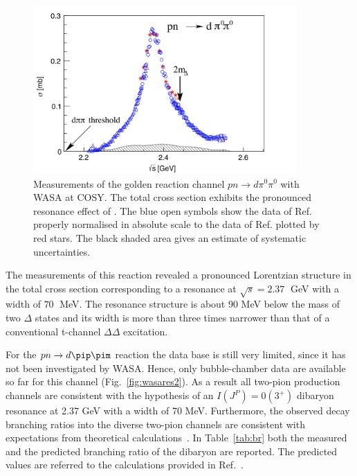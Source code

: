 \begin{figure} [htb]
    \centering
    \includegraphics[width=0.9\textwidth]{gfx/wasares1}
	\caption{Measurements of the golden reaction channel $pn \rightarrow d \pi^{0} \pi^{0}$ with WASA at COSY. The total cross section exhibits the pronounced resonance effect of \dst. The blue open symbols show the data of Ref.\cite{wasa1} properly normalised in absolute scale to the data of Ref.\cite{wasa2} plotted by red stars. The black shaded area gives an estimate of systematic uncertainties.}
	\label{fig:wasares1}
\end{figure}

The measurements of this reaction revealed a pronounced Lorentzian structure in the total cross section
corresponding to a resonance at $\sqrt{s} = 2.37\;$ GeV with a width of $70\;$ MeV. 
The resonance structure is about 90 MeV below the mass of two $\Delta$ states and its width is more 
than three times narrower than that of a conventional t-channel $\Delta\Delta$ excitation.

For the $pn \rightarrow d \pip \pim$ reaction the data base is still very limited, since it has not been
investigated by WASA. Hence, only bubble-chamber data are available so far for this channel 
(Fig.~\ref{fig:wasares2}).
As a result all two-pion production channels are consistent with the hypothesis of an $I(J^{P}) = 0(3^{+})$
dibaryon resonance at 2.37 GeV with a width of 70 MeV. 
Furthermore, the observed \ds decay branching ratios into the diverse two-pion channels are consistent with
expectations from theoretical calculations~\cite{brcalc,brpred1,brpred2}.
In Table~\ref{tab:br} both the measured and the predicted branching ratio of the \ds dibaryon are
reported. The predicted values are referred to the calculations provided in Ref.~\cite{widthpred3}.

